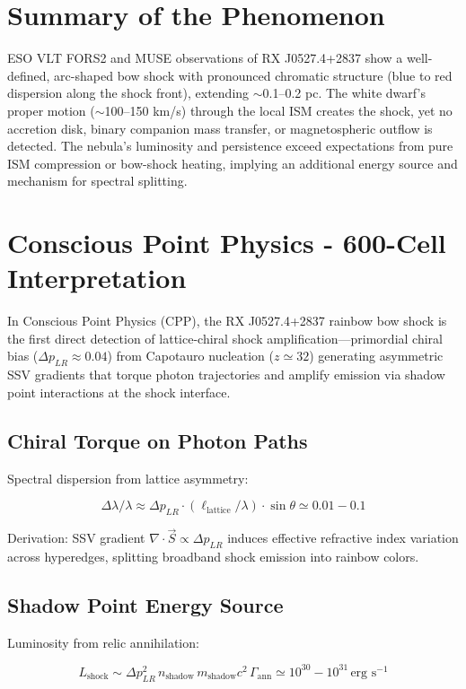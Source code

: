 \documentclass[11pt]{article}
\begin{document}
\section{Summary of the Phenomenon}
ESO VLT FORS2 and MUSE observations of RX J0527.4+2837 show a well-defined, arc-shaped bow shock with pronounced chromatic structure (blue to red dispersion along the shock front), extending $\sim$0.1--0.2 pc. The white dwarf's proper motion ($\sim$100--150 km/s) through the local ISM creates the shock, yet no accretion disk, binary companion mass transfer, or magnetospheric outflow is detected. The nebula's luminosity and persistence exceed expectations from pure ISM compression or bow-shock heating, implying an additional energy source and mechanism for spectral splitting.

\section{Conscious Point Physics - 600-Cell Interpretation}
In Conscious Point Physics (CPP), the RX J0527.4+2837 rainbow bow shock is the first direct detection of lattice-chiral shock amplification—primordial chiral bias ($\Delta p_{LR} \approx 0.04$) from Capotauro nucleation ($z \simeq 32$) generating asymmetric SSV gradients that torque photon trajectories and amplify emission via shadow point interactions at the shock interface.

\subsection{Chiral Torque on Photon Paths}
Spectral dispersion from lattice asymmetry:

\[
\Delta \lambda / \lambda \approx \Delta p_{LR} \cdot (\ell_{\text{lattice}} / \lambda) \cdot \sin\theta \simeq 0.01 - 0.1
\]

Derivation: SSV gradient $\nabla \cdot \vec{S} \propto \Delta p_{LR}$ induces effective refractive index variation across hyperedges, splitting broadband shock emission into rainbow colors.

\subsection{Shadow Point Energy Source}
Luminosity from relic annihilation:

\[
L_{\text{shock}} \sim \Delta p_{LR}^2 \, n_{\text{shadow}} \, m_{\text{shadow}} c^2 \, \Gamma_{\text{ann}} \simeq 10^{30} - 10^{31} \, \text{erg s}^{-1}
\]
\end{document}
